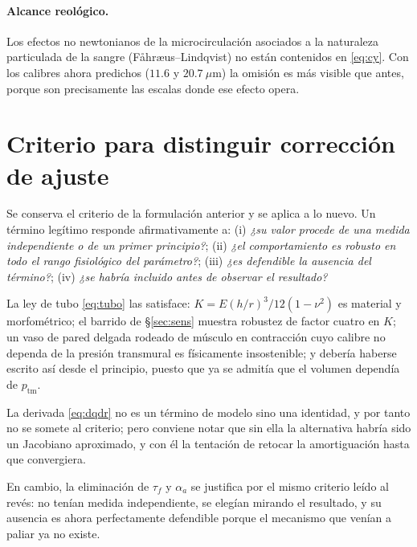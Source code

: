 \documentclass[11pt]{article}
\newcommand{\ptm}{p_{\mathrm{tm}}}
\begin{document}
\paragraph{Alcance reol\'ogico.} Los efectos no newtonianos de la
microcirculaci\'on asociados a la naturaleza particulada de la sangre
(F\aa hr\ae us--Lindqvist) no est\'an contenidos en \eqref{eq:cy}. Con los
calibres ahora predichos ($11.6$ y $20.7~\mu$m) la omisi\'on es m\'as visible
que antes, porque son precisamente las escalas donde ese efecto opera.

\section{Criterio para distinguir correcci\'on de ajuste}

Se conserva el criterio de la formulaci\'on anterior y se aplica a lo nuevo.
Un t\'ermino leg\'itimo responde afirmativamente a: (i) \emph{¿su valor procede
de una medida independiente o de un primer principio?}; (ii) \emph{¿el
comportamiento es robusto en todo el rango fisiol\'ogico del par\'ametro?};
(iii) \emph{¿es defendible la ausencia del t\'ermino?}; (iv) \emph{¿se habr\'ia
incluido antes de observar el resultado?}

La ley de tubo \eqref{eq:tubo} las satisface: $K=E(h/r)^3/12(1-\nu^2)$ es
material y morfom\'etrico; el barrido de \S\ref{sec:sens} muestra robustez de
factor cuatro en $K$; un vaso de pared delgada rodeado de m\'usculo en
contracci\'on cuyo calibre no dependa de la presi\'on transmural es
f\'isicamente insostenible; y deber\'ia haberse escrito as\'i desde el
principio, puesto que ya se admit\'ia que el volumen depend\'ia de $\ptm$.

La derivada \eqref{eq:dqdr} no es un t\'ermino de modelo sino una identidad, y
por tanto no se somete al criterio; pero conviene notar que sin ella la
alternativa habr\'ia sido un Jacobiano aproximado, y con \'el la tentaci\'on de
retocar la amortiguaci\'on hasta que convergiera.

En cambio, la eliminaci\'on de $\tau_f$ y $\alpha_a$ se justifica por el mismo
criterio le\'ido al rev\'es: no ten\'ian medida independiente, se eleg\'ian
mirando el resultado, y su ausencia es ahora perfectamente defendible porque el
mecanismo que ven\'ian a paliar ya no existe.
\end{document}
